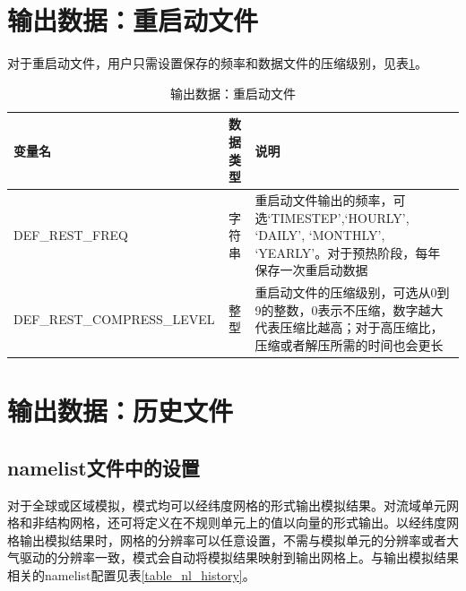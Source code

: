 \documentclass[a4paper,12pt,twoside]{article}
\begin{document}
\section{输出数据：重启动文件}\label{restart}
对于重启动文件，用户只需设置保存的频率和数据文件的压缩级别，见表\ref{table_nl_restart}。
\begin{table}[!htbp] \small
\caption{输出数据：重启动文件}\label{table_nl_restart}
\centering \renewcommand{\arraystretch}{1.2}
\begin{tabular}{lcp{}}
\toprule
\textbf{变量名} & \textbf{数据类型} & \textbf{说明} \\\midrule
DEF\_REST\_FREQ & 字符串 & 重启动文件输出的频率，可选`TIMESTEP',`HOURLY', `DAILY', `MONTHLY', `YEARLY'。对于预热阶段，每年保存一次重启动数据 \\
DEF\_REST\_COMPRESS\_LEVEL & 整型 & 重启动文件的压缩级别，可选从0到9的整数，0表示不压缩，数字越大代表压缩比越高；对于高压缩比，压缩或者解压所需的时间也会更长 \\
\bottomrule
\end{tabular} 
\end{table}

\section{输出数据：历史文件}\label{history}

\subsection{namelist文件中的设置}

对于全球或区域模拟，模式均可以经纬度网格的形式输出模拟结果。对流域单元网格和非结构网格，还可将定义在不规则单元上的值以向量的形式输出。以经纬度网格输出模拟结果时，网格的分辨率可以任意设置，不需与模拟单元的分辨率或者大气驱动的分辨率一致，模式会自动将模拟结果映射到输出网格上。与输出模拟结果相关的namelist配置见表\ref{table_nl_history}。
\end{document}
